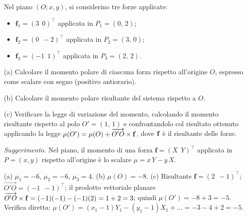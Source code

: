 \begin{esercizio}
	\label{ex:A03_piano_momenti}
	
	Nel piano $(O; x, y)$, si considerino tre forze applicate:
	\begin{itemize}[noitemsep,topsep=2pt]
		\item $\bm{f}_1 = (3\;\,0)^\top$ applicata in $P_1 = (0,\,2)$;
		\item $\bm{f}_2 = (0\;\,-2)^\top$ applicata in $P_2 = (3,\,0)$;
		\item $\bm{f}_3 = (-1\;\,1)^\top$ applicata in $P_3 = (2,\,2)$.
	\end{itemize}
	
	(a) Calcolare il momento polare di ciascuna forza rispetto all'origine $O$, espresso come scalare con segno (positivo antiorario).
	
	(b) Calcolare il momento polare risultante del sistema rispetto a $O$.
	
	(c) Verificare la legge di variazione del momento, calcolando il momento risultante rispetto al polo $O' = (1,\,1)$ e confrontandolo col risultato ottenuto applicando la legge $\mu(O') = \mu(O) + \overrightarrow{O'O} \times \mathbf{f}$, dove $\mathbf{f}$ è il risultante delle forze.
	
	\textit{Suggerimento.} Nel piano, il momento di una forza $\bm{f} = (X\;\,Y)^\top$ applicata in $P = (x, y)$ rispetto all'origine è lo scalare $\mu = x \, Y - y \, X$.
	
	\risultato (a) $\mu_1 = -6$, $\mu_2 = -6$, $\mu_3 = 4$. (b) $\mu(O) = -8$. (c) Risultante $\bm{f} = (2\;\,-1)^\top$; $\overrightarrow{O'O} = (-1\;\,-1)^\top$; il prodotto vettoriale planare $\overrightarrow{O'O} \times \mathbf{f} = (-1)(-1) - (-1)(2) = 1 + 2 = 3$; quindi $\mu(O') = -8 + 3 = -5$. Verifica diretta: $\mu(O') = (x_1 - 1)Y_1 - (y_1 - 1)X_1 + \ldots = -3 - 4 + 2 = -5$.
	
\end{esercizio}

